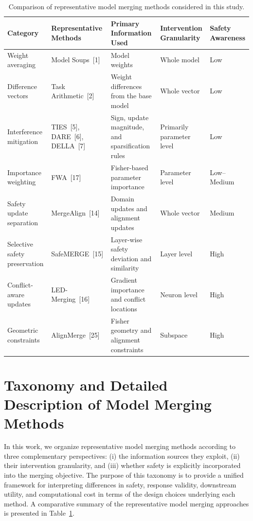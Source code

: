 \begin{table}[t]
\centering
\caption{Comparison of representative model merging methods considered in this study.}
\label{tab:method-comparison-revised}
\small
\begin{tabular}{p{2.3cm}p{2.7cm}p{2.8cm}p{2.0cm}p{1.8cm}}
\toprule
\textbf{Category} & \textbf{Representative Methods} & \textbf{Primary Information Used} & \textbf{Intervention Granularity} & \textbf{Safety Awareness} \\
\midrule
Weight averaging & Model Soups~[1] & Model weights & Whole model & Low \\
Difference vectors & Task Arithmetic~[2] & Weight differences from the base model & Whole vector & Low \\
Interference mitigation & TIES~[5], DARE~[6], DELLA~[7] & Sign, update magnitude, and sparsification rules & Primarily parameter level & Low \\
Importance weighting & FWA~[17] & Fisher-based parameter importance & Parameter level & Low--Medium \\
Safety update separation & MergeAlign~[14] & Domain updates and alignment updates & Whole vector & Medium \\
Selective safety preservation & SafeMERGE~[15] & Layer-wise safety deviation and similarity & Layer level & High \\
Conflict-aware updates & LED-Merging~[16] & Gradient importance and conflict locations & Neuron level & High \\
Geometric constraints & AlignMerge~[25] & Fisher geometry and alignment constraints & Subspace & High \\
\bottomrule
\end{tabular}
\end{table}

\section{Taxonomy and Detailed Description of Model Merging Methods}
\label{app:method-taxonomy-and-details}

In this work, we organize representative model merging methods according to three complementary perspectives: (i) the information sources they exploit, (ii) their intervention granularity, and (iii) whether safety is explicitly incorporated into the merging objective. The purpose of this taxonomy is to provide a unified framework for interpreting differences in safety, response validity, downstream utility, and computational cost in terms of the design choices underlying each method. A comparative summary of the representative model merging approaches is presented in Table~\ref{tab:method-comparison-revised}.

